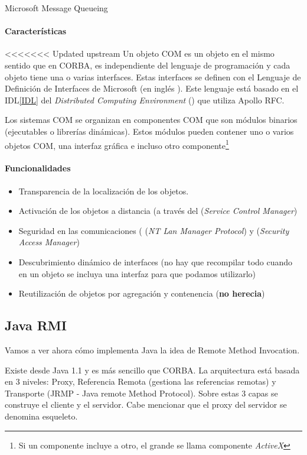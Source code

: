 \begin{defn}[MSMQ]
	Microsoft Message Queueing
\end{defn}

\paragraph{Características}
<<<<<<< Updated upstream
Un objeto COM es un objeto en el mismo sentido que en CORBA,  es independiente del lenguaje de programación y cada objeto tiene una o varias interfaces. Estas interfaces se definen con el Lenguaje de Definición de Interfaces de Microsoft (en inglés ). Este lenguaje está basado en el IDL\ref{IDL} del \textit{Distributed Computing Environment} () que utiliza Apollo RFC.

Los sistemas COM se organizan en componentes COM que son módulos binarios (ejecutables o librerías dinámicas). Estos módulos pueden contener uno o varios objetos COM, una interfaz gráfica e incluso otro componente\footnote{Si un componente incluye a otro, el grande se llama componente \textit{ActiveX}}

\paragraph{Funcionalidades}

\begin{itemize}
	\item Transparencia de la localización de los objetos.
	\item Activación de los objetos a distancia (a través del  (\textit{Service Control Manager})
	\item Seguridad en las comunicaciones ( (\textit{NT Lan Manager Protocol}) y  (\textit{Security Access Manager})
	\item Descubrimiento dinámico de interfaces (no hay que recompilar todo cuando en un objeto se incluya una interfaz para que podamos utilizarlo)
	\item Reutilización de objetos por agregación y contenencia (\textbf{no herecia})
\end{itemize}


\subsection{Java RMI}
Vamos a ver ahora cómo implementa Java la idea de Remote Method Invocation.

Existe desde Java 1.1 y es más sencillo que CORBA. La arquitectura está basada en 3 niveles: Proxy, Referencia Remota (gestiona las referencias remotas) y Transporte (JRMP - Java remote Method Protocol). Sobre estas 3 capas se construye el cliente y el servidor. Cabe mencionar que el proxy del servidor se denomina esqueleto.


